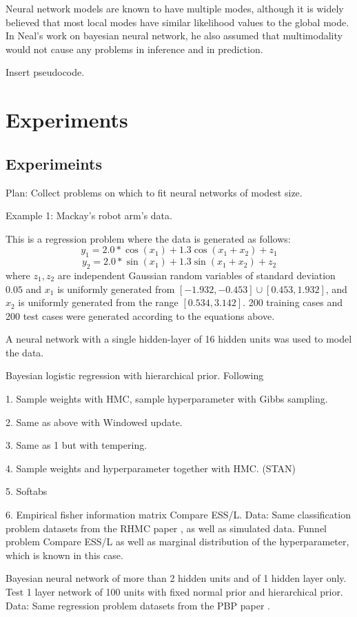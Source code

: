 \documentclass{book}
\begin{document}
\begin{enumerate}

Neural network models are known to have multiple modes, although it is widely believed that most local modes have similar likelihood values to the global mode. In Neal's work on bayesian neural network, he also assumed that multimodality would not cause any problems in inference and in prediction. 


Insert pseudocode. 
\part{Experiments}
\chapter{Experimeints}
Plan:
Collect problems on which to fit neural networks of modest size. 

Example 1: Mackay's robot arm's data. 

This is a regression problem where the data is generated as follows:
\[ y_1 = 2.0 * \cos(x_1) + 1.3 \cos(x_1+x_2) + z_1 \]
\[ y_2 = 2.0 * \sin(x_1) + 1.3 \sin(x_1+x_2) + z_2 \]
where $z_1,z_2$ are independent Gaussian random variables of standard deviation
$0.05$ and $x_1$ is uniformly generated from $[-1.932,-0.453]\cup
[0.453,1.932]$, and $x_2$ is uniformly generated from the range $[0.534,3.142]$.
200 training cases and 200 test cases were generated according to the equations
above. 

A neural network with a single hidden-layer of 16 hidden units was used to model
the data.

Bayesian logistic regression with hierarchical prior. Following \cite{zhang2014semi}

1. Sample weights with HMC, sample hyperparameter with Gibbs sampling.

2. Same as above with Windowed update.

3. Same as 1 but with tempering. 

4. Sample weights and hyperparameter together with HMC. (STAN)

5. Softabs 

6. Empirical fisher information matrix 
Compare ESS/L.
Data: Same classification problem datasets from the RHMC paper \cite{girolami2011riemann}, as well as simulated data.
Funnel problem
Compare ESS/L as well as marginal distribution of the hyperparameter, which is known in this case. 

Bayesian neural network of more than 2 hidden units and of 1 hidden layer only. Test 1 layer network of 100 units with fixed normal prior and hierarchical prior.
Data: Same regression problem datasets from the PBP paper \cite{hernandez2015probabilistic}. 



\end{enumerate}
\end{document}
